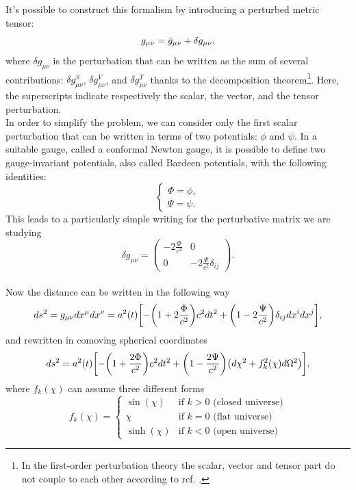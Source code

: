 It's possible to construct this formalism by introducing a perturbed metric tensor:
\begin{equation}
    g_{\mu \nu} = \Bar{g}_{\mu \nu} + \delta g_{\mu \nu},
\end{equation}
where $\delta g_{\mu \nu}$ is the perturbation that can be written as the sum of several contributions: $\delta g_{\mu \nu}^S$, $\delta g_{\mu \nu} ^V$, and $\delta g_{\mu \nu} ^T$ thanks to the decomposition theorem\footnote{In the first-order perturbation theory the scalar, vector and tensor part do not couple to each other according to ref. \cite{Relativistic_perturbation}.}. Here, the superscripts indicate respectively the scalar, the vector, and the tensor perturbation.\\ In order to simplify the problem, we can consider only the first scalar perturbation that can be written in terms of two potentials: $\phi$ and $\psi$.
In a suitable gauge, called a conformal Newton gauge, it is possible to define two gauge-invariant potentials, also called Bardeen potentials, with the following identities:
\begin{equation}
    \begin{cases}
    \Phi = \phi, \\
    \Psi = \psi .
    \end{cases}
\end{equation}
This leads to a particularly simple writing for the perturbative matrix we are studying
\begin{equation}
    \delta g_{\mu \nu} = \begin{pmatrix}
    -2\frac{\Phi}{c^2} & 0 \\
    0 & -2\frac{\Psi}{c^2} \delta_{ij}
\end{pmatrix}.
\end{equation}\\
Now the distance can be written in the following way
\begin{equation}
    ds^2 = g_{\mu \nu} dx^\mu dx^\nu = a^2(t) \qty[-\qty(1+2\frac{\Phi}{c^2}) c^2 dt^2 + \qty(1-2\frac{\Psi}{c^2})\delta_{ij}dx^idx^j],
\end{equation}
and rewritten in comoving spherical coordinates
\begin{equation}\label{metric with badern potential}
    ds^2 = a^2(t) \qty[-\qty(1+\frac{2\Phi}{c^2})c^2 dt^2 + \qty(1-\frac{2\Psi}{c^2}) \qty(d\chi^2+f_k^2(\chi)d\Omega^2) ],
\end{equation}
where $f_k (\chi)$ can assume three different forms
\begin{equation}
f_k(\chi) =
\begin{cases}
\sin(\chi) & \text{if } k > 0 \text{ (closed universe)} \\
\chi & \text{if } k = 0 \text{ (flat universe)} \\
\sinh(\chi) & \text{if } k < 0 \text{ (open universe)}
\end{cases}
\end{equation}

